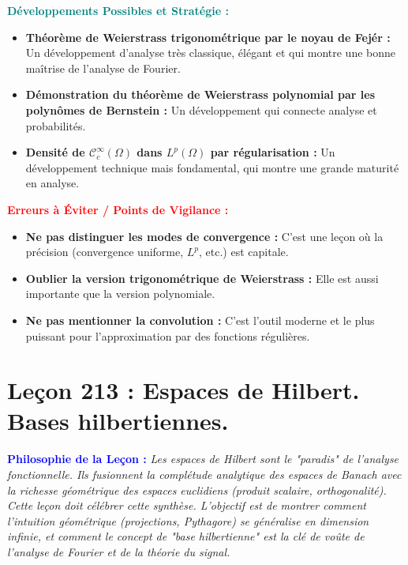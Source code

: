 \documentclass[12pt, a4paper, parskip=full]{report}
\theoremstyle{agregstyle}
\newenvironment{philosophie}
  {\par\medskip\noindent\begin{oframed}\noindent\textbf{\textcolor{blue}{Philosophie de la Leçon :}}\itshape}
  {\end{oframed}\par\medskip}
\newenvironment{developpements}
  {\par\medskip\noindent\begin{oframed}\noindent\textbf{\textcolor{teal}{Développements Possibles et Stratégie :}}}
  {\end{oframed}\par\medskip}
\newenvironment{erreurs}
  {\par\medskip\noindent\begin{oframed}\noindent\textbf{\textcolor{red}{Erreurs à Éviter / Points de Vigilance :}}}
  {\end{oframed}\par\medskip}
\begin{document}
\begin{developpements}
    \begin{itemize}
        \item \textbf{Théorème de Weierstrass trigonométrique par le noyau de Fejér :} Un développement d'analyse très classique, élégant et qui montre une bonne maîtrise de l'analyse de Fourier.
        \item \textbf{Démonstration du théorème de Weierstrass polynomial par les polynômes de Bernstein :} Un développement qui connecte analyse et probabilités.
        \item \textbf{Densité de $\mathcal{C}_c^\infty(\Omega)$ dans $L^p(\Omega)$ par régularisation :} Un développement technique mais fondamental, qui montre une grande maturité en analyse.
    \end{itemize}
\end{developpements}

\begin{erreurs}
    \begin{itemize}
        \item \textbf{Ne pas distinguer les modes de convergence :} C'est une leçon où la précision (convergence uniforme, $L^p$, etc.) est capitale.
        \item \textbf{Oublier la version trigonométrique de Weierstrass :} Elle est aussi importante que la version polynomiale.
        \item \textbf{Ne pas mentionner la convolution :} C'est l'outil moderne et le plus puissant pour l'approximation par des fonctions régulières.
    \end{itemize}
\end{erreurs}
\chapter{Leçon 213 : Espaces de Hilbert. Bases hilbertiennes.}

\begin{philosophie}
    Les espaces de Hilbert sont le "paradis" de l'analyse fonctionnelle. Ils fusionnent la complétude analytique des espaces de Banach avec la richesse géométrique des espaces euclidiens (produit scalaire, orthogonalité). Cette leçon doit célébrer cette synthèse. L'objectif est de montrer comment l'intuition géométrique (projections, Pythagore) se généralise en dimension infinie, et comment le concept de "base hilbertienne" est la clé de voûte de l'analyse de Fourier et de la théorie du signal.
\end{philosophie}
\end{document}
